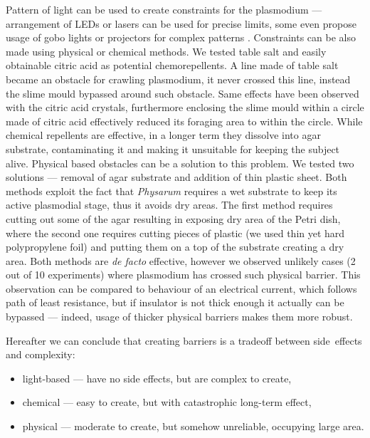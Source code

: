 Pattern of light can be used to create constraints for the plasmodium --- arrangement of LEDs or lasers can be used for precise limits, some even propose usage of gobo lights or projectors for complex patterns \cite{zhu2013amoeba}. Constraints can be also made using physical or chemical methods. We tested table salt and easily obtainable citric acid as potential chemorepellents. A line made of table salt became an obstacle for crawling plasmodium, it never crossed this line, instead the slime mould bypassed around such obstacle. Same effects have been observed with the citric acid crystals, furthermore enclosing the slime mould within a circle made of citric acid effectively reduced its foraging area to within the circle. While chemical repellents are effective, in a longer term they dissolve into agar substrate, contaminating it and making it unsuitable for keeping the subject alive. Physical based obstacles can be a solution to this problem. We tested two solutions --- removal of agar substrate and addition of thin plastic sheet. Both methods exploit the fact that \textit{Physarum} requires a wet substrate to keep its active plasmodial stage, thus it avoids dry areas. The first method requires cutting out some of the agar resulting in exposing dry area of the Petri dish, where the second one requires cutting pieces of plastic (we used thin yet hard polypropylene foil) and putting them on a top of the substrate creating a dry area. Both methods are \textit{de facto} effective, however we observed unlikely cases (2 out of 10 experiments) where plasmodium has crossed such physical barrier. This observation can be compared to behaviour of an electrical current, which follows path of least resistance, but if insulator is not thick enough it actually can be bypassed --- indeed, usage of thicker physical barriers makes them more robust. 

Hereafter we can conclude that creating barriers is a tradeoff between side~effects and complexity:
\begin{itemize}
  \item light-based --- have no side effects, but are complex to create,
  \item chemical --- easy to create, but with catastrophic long-term effect,
  \item physical --- moderate to create, but somehow unreliable, occupying large area.
\end{itemize}


